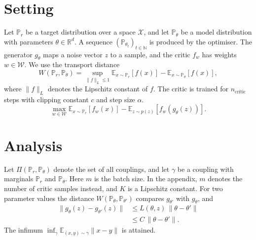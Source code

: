 \documentclass[11pt]{article}
\begin{document}
\section{Setting}
Let $\mathbb{P}_r$ be a target distribution over a space $\mathcal{X}$, and let
$\mathbb{P}_{\theta}$ be a model distribution with parameters $\theta \in \mathbb{R}^{d}$.
A sequence $(\mathbb{P}_{\theta_t})_{t \in \mathbb{N}}$ is produced by the optimiser.
The generator $g_{\theta}$ maps a noise vector $z$ to a sample, and the critic $f_w$ has
weights $w \in \mathcal{W}$. We use the transport distance
\begin{equation}
  W(\mathbb{P}_r, \mathbb{P}_{\theta}) = \sup_{\|f\|_L \leq 1} \mathbb{E}_{x \sim \mathbb{P}_r}[f(x)] - \mathbb{E}_{x \sim \mathbb{P}_{\theta}}[f(x)],
\end{equation}
where $\|f\|_L$ denotes the Lipschitz constant of $f$. The critic is trained for
$n_{\mathrm{critic}}$ steps with clipping constant $c$ and step size $\alpha$.
\begin{equation}
  \max_{w \in \mathcal{W}} \mathbb{E}_{x \sim \mathbb{P}_r}[f_w(x)] - \mathbb{E}_{z \sim p(z)}[f_w(g_{\theta}(z))].
\end{equation}
\section{Analysis}
Let $\Pi(\mathbb{P}_r, \mathbb{P}_{\theta})$ denote the set of all couplings, and let
$\gamma$ be a coupling with marginals $\mathbb{P}_r$ and $\mathbb{P}_{\theta}$. Here $m$ is the
batch size. In the appendix, $m$ denotes the number of critic samples instead, and $K$ is a
Lipschitz constant. For two parameter values the distance
$W(\mathbb{P}_{\theta}, \mathbb{P}_{\theta'})$ compares $g_{\theta'}$ with $g_{\theta}$, and
\begin{equation}
\begin{split}
  \| g_{\theta}(z) - g_{\theta'}(z) \| &\leq L(\theta, z) \, \| \theta - \theta' \| \\
  &\leq C \, \| \theta - \theta' \|.
\end{split}
\end{equation}
The infimum $\inf_{\gamma} \mathbb{E}_{(x, y) \sim \gamma} \|x - y\|$ is
attained.
\end{document}
